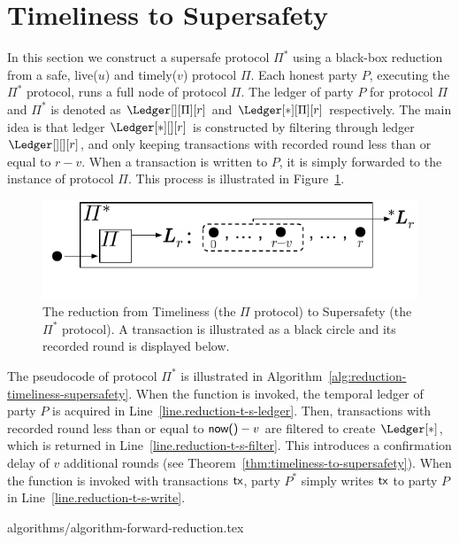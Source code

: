 \section{Timeliness to Supersafety}\label{forward-reduction}

In this section we construct a supersafe protocol
$\Pi^*$ using a black-box reduction from a safe, live($u$) and timely($v$)
protocol $\Pi$.
Each honest party $P$, executing the $\Pi^*$ protocol, runs a
full node of protocol $\Pi$.
The ledger of party $P$ for protocol $\Pi$ and $\Pi^*$ is denoted as $\Ledger[][\Pi][r]$ and
$\Ledger[*][\Pi][r]$ respectively.
The main idea is that ledger $\Ledger[*][][r]$ is constructed
by filtering through ledger $\Ledger[][][r]$, and only keeping transactions
with recorded round less than or equal to $r - v$. When a transaction
is written to $P$, it is simply forwarded to the instance of protocol $\Pi$. This process is illustrated
in Figure~\ref{fig:reduction-timeliness-supersafety}.

\begin{figure}
  \centering
  \includegraphics[width=0.7\columnwidth,keepaspectratio]{figures/forward-reduction.pdf}
  \caption{The reduction from Timeliness
    (the $\Pi$ protocol) to Supersafety (the $\Pi^*$ protocol). A transaction is illustrated
    as a black circle and its recorded round is displayed below.
  }
 \label{fig:reduction-timeliness-supersafety}
\end{figure}

The pseudocode of protocol $\Pi^*$ is illustrated in Algorithm~\ref{alg:reduction-timeliness-supersafety}.
When the \rread function is invoked, the temporal ledger of party $P$ is acquired
in Line~\ref{line.reduction-t-s-ledger}.
Then, transactions with recorded round less than or equal to $\textsf{now()} - v$ are
filtered to create $\Ledger[*]$, which is returned in Line~\ref{line.reduction-t-s-filter}.
This introduces a confirmation delay of $v$ additional rounds (see Theorem~\ref{thm:timeliness-to-supersafety}).
When the \wwrite function is invoked with transactions $\textsf{tx}$, party $P^*$ simply writes $\textsf{tx}$
to party $P$ in Line~\ref{line.reduction-t-s-write}.

{algorithms/algorithm-forward-reduction.tex}

